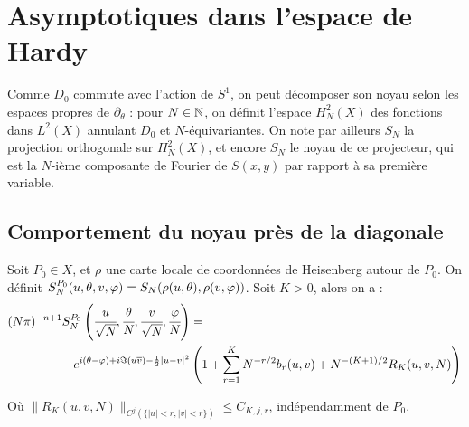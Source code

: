 \section{Asymptotiques dans l'espace de Hardy}

Comme $D_0$ commute avec l'action de $S^1$, on peut décomposer son noyau selon les espaces propres de $\partial_{\theta}$ : pour $N \in \mathbb{N}$, on définit l'espace $H^2_N(X)$ des fonctions dans $L^2(X)$ annulant $D_0$ et $N$-équivariantes. On note par ailleurs  $S_N$ la projection orthogonale sur $H^2_N(X)$, et encore $S_N$ le noyau de ce projecteur, qui est la $N$-ième composante de Fourier de $S(x,y)$ par rapport à sa première variable.

\subsection{Comportement du noyau près de la diagonale}

\begin{theorem}
	Soit $P_0 \in X$, et $\rho$ une carte locale de coordonnées de Heisenberg autour de $P_0$. On définit $S_N^{P_0}(u,\theta,v,\varphi) = S_N(\rho(u,\theta), \rho(v,\varphi))$. Soit $K>0$, alors on a :
	\begin{align*}
	(N\pi)^{-n+1}S_N^{P_0}\left(\cfrac{u}{\sqrt{N}},\cfrac{\theta}{N}, \cfrac{v}{\sqrt{N}}, \cfrac{\varphi}{N}\right) &= \\e^{i(\theta-\varphi) + i \Im(u\overline{v}) - \frac12 |u-v|^2}&\left(1+\sum_{r=1}^K N^{-r/2}b_r(u,v) + N^{-(K+1)/2}R_K(u,v,N)\right)
	\end{align*}
	
	Où $\|R_K(u,v,N)\|_{C^j(\{|u| < r, |v| < r\})} \leq C_{K,j,r}$, indépendamment de $P_0$.
\end{theorem}

